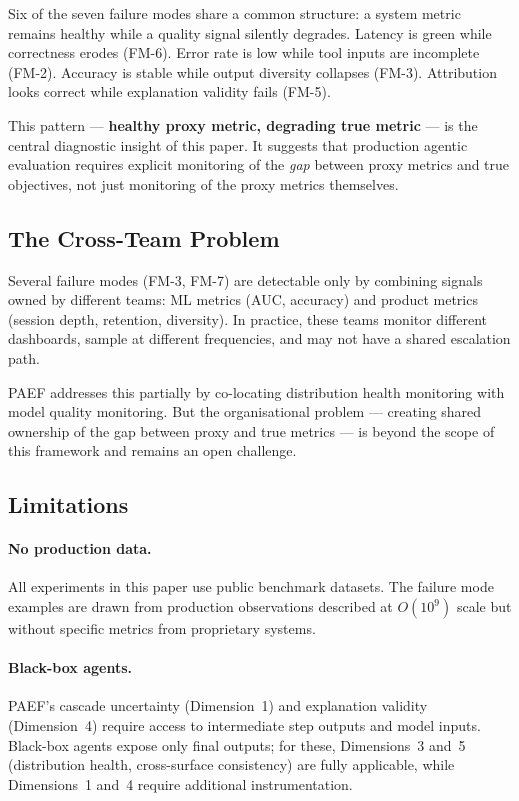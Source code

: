 \documentclass{article}
\begin{document}
Six of the seven failure modes share a common structure: a system metric
remains healthy while a quality signal silently degrades.  Latency is green
while correctness erodes (FM-6).  Error rate is low while tool inputs are
incomplete (FM-2).  Accuracy is stable while output diversity collapses (FM-3).
Attribution looks correct while explanation validity fails (FM-5).

This pattern --- \textbf{healthy proxy metric, degrading true metric} --- is
the central diagnostic insight of this paper.  It suggests that production
agentic evaluation requires explicit monitoring of the \emph{gap} between proxy
metrics and true objectives, not just monitoring of the proxy metrics
themselves.

\subsection{The Cross-Team Problem}

Several failure modes (FM-3, FM-7) are detectable only by combining signals
owned by different teams: ML metrics (AUC, accuracy) and product metrics
(session depth, retention, diversity).  In practice, these teams monitor
different dashboards, sample at different frequencies, and may not have a
shared escalation path.

PAEF addresses this partially by co-locating distribution health monitoring
with model quality monitoring.  But the organisational problem --- creating
shared ownership of the gap between proxy and true metrics --- is beyond the
scope of this framework and remains an open challenge.

\subsection{Limitations}

\paragraph{No production data.}
All experiments in this paper use public benchmark datasets.  The failure mode
examples are drawn from production observations described at $O(10^9)$ scale
but without specific metrics from proprietary systems.

\paragraph{Black-box agents.}
PAEF's cascade uncertainty (Dimension~1) and explanation validity
(Dimension~4) require access to intermediate step outputs and model inputs.
Black-box agents expose only final outputs; for these, Dimensions~3 and~5
(distribution health, cross-surface consistency) are fully applicable, while
Dimensions~1 and~4 require additional instrumentation.
\end{document}
